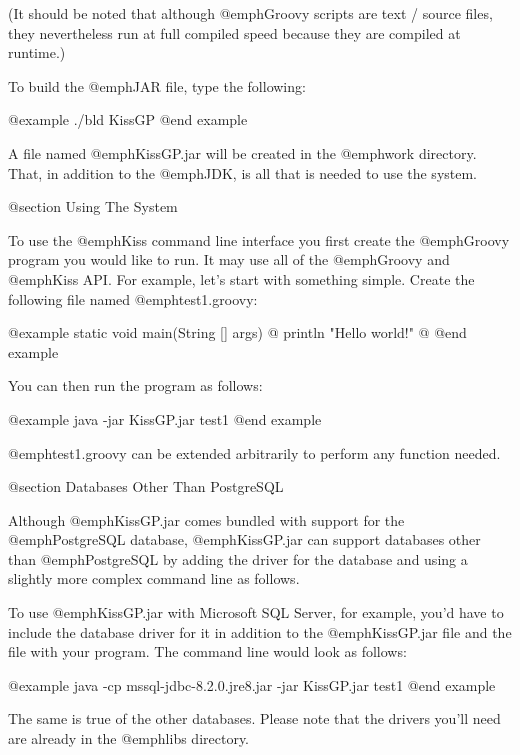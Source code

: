 (It should be noted that although @emph{Groovy} scripts are text /
source files, they nevertheless run at full compiled speed because
they are compiled at runtime.)

To build the @emph{JAR} file, type the following:

@example
./bld KissGP
@end example

A file named @emph{KissGP.jar} will be created in the @emph{work}
directory.  That, in addition to the @emph{JDK}, is all that is needed to
use the system.

@section Using The System

To use the @emph{Kiss} command line interface you first create the
@emph{Groovy} program you would like to run.  It may use all of the
@emph{Groovy} and @emph{Kiss} API.  For example, let's start with
something simple.  Create the following file named
@emph{test1.groovy}:

@example
static void main(String [] args) @{
    println "Hello world!"
@}
@end example

You can then run the program as follows:

@example
java -jar KissGP.jar test1
@end example

@emph{test1.groovy} can be extended arbitrarily to perform any function needed.

@section Databases Other Than PostgreSQL

Although @emph{KissGP.jar} comes bundled with support for the
@emph{PostgreSQL} database, @emph{KissGP.jar} can support databases
other than @emph{PostgreSQL} by adding the driver for the database and
using a slightly more complex command line as follows.

To use @emph{KissGP.jar} with Microsoft SQL Server, for example, you'd
have to include the database driver for it in addition to the
@emph{KissGP.jar} file and the file with your program.  The command
line would look as follows:

@example
java -cp mssql-jdbc-8.2.0.jre8.jar -jar KissGP.jar test1
@end example

The same is true of the other databases.  Please note that the drivers
you'll need are already in the @emph{libs} directory.


